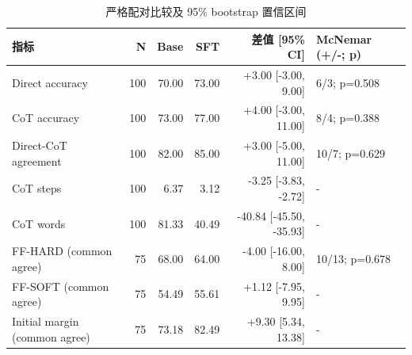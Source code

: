 \begin{table}[H]
\centering
\small
\caption{严格配对比较及 95\% bootstrap 置信区间}
\label{tab:paired}
\begin{tabular}{lrrrrl}
\toprule
指标 & N & Base & SFT & 差值 [95\% CI] & McNemar (+/-; p) \\
\midrule
Direct accuracy & 100 & 70.00 & 73.00 & +3.00 [-3.00, 9.00] & 6/3; p=0.508 \\
CoT accuracy & 100 & 73.00 & 77.00 & +4.00 [-3.00, 11.00] & 8/4; p=0.388 \\
Direct-CoT agreement & 100 & 82.00 & 85.00 & +3.00 [-5.00, 11.00] & 10/7; p=0.629 \\
CoT steps & 100 & 6.37 & 3.12 & -3.25 [-3.83, -2.72] & - \\
CoT words & 100 & 81.33 & 40.49 & -40.84 [-45.50, -35.93] & - \\
FF-HARD (common agree) & 75 & 68.00 & 64.00 & -4.00 [-16.00, 8.00] & 10/13; p=0.678 \\
FF-SOFT (common agree) & 75 & 54.49 & 55.61 & +1.12 [-7.95, 9.95] & - \\
Initial margin (common agree) & 75 & 73.18 & 82.49 & +9.30 [5.34, 13.38] & - \\
\bottomrule
\end{tabular}
\end{table}
